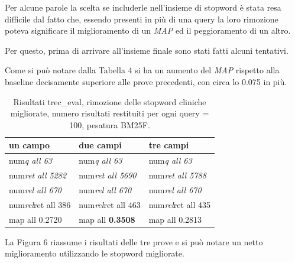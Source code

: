 \documentclass[runningheads]{llncs}
\begin{document}
Per alcune parole la scelta se includerle nell'insieme di stopword \`e stata resa difficile dal fatto che, essendo presenti in pi\`u di una query la loro rimozione poteva significare il miglioramento di un \textit{MAP} ed il peggioramento di un altro.

Per questo, prima di arrivare all'insieme finale sono stati fatti alcuni tentativi.




Come si pu\`o notare dalla Tabella 4 si ha un aumento del \textit{MAP} rispetto alla baseline decisamente superiore alle prove precedenti, con circa lo 0.075 in pi\`u.
\begin{table}
\vspace{-3mm}
\centering
\begin{tabular}{lll}
\hline
\textbf{ un campo }           & \textbf{ due campi }           & \textbf{ tre campi }            \\ \hline
 num\textit{q all 63 }       &  num\textit{q all 63 }       &  num\textit{q all 63 }        \\
 num\textit{ret all 5282 }  &  num\textit{ret all 5690 }  &  num\textit{ret all 5788 }   \\
 num\textit{rel all 670 }    &  num\textit{rel all 670 }    &  num\textit{rel all 670 }     \\
 num\textit{rel}ret all 386  &  num\textit{rel}ret all 463  &  num\textit{rel}ret all 435   \\
map all 0.2720               & map all \bf 0.3508               & map all 0.2813          \\ \hline
\end{tabular}

\caption{ Risultati trec\_eval, rimozione delle stopword cliniche migliorate, numero risultati restituiti per ogni query = 100, pesatura BM25F.}
\vspace{-7mm}
\end{table}

La Figura 6 riassume i risultati delle tre prove e si pu\`o notare un netto miglioramento utilizzando le stopword migliorate.
\end{document}
